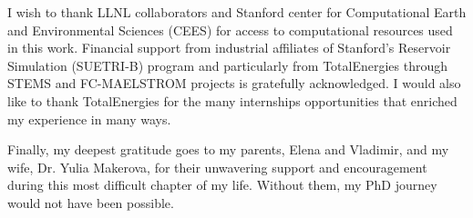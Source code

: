 I wish to thank LLNL collaborators and Stanford center for Computational Earth and Environmental Sciences (CEES) for access to computational resources used in this work.   Financial support from industrial affiliates of Stanford's Reservoir Simulation (SUETRI-B) program and particularly from TotalEnergies through STEMS and FC-MAELSTROM projects is gratefully acknowledged.   I would also like to thank TotalEnergies for the many internships opportunities that enriched my experience in many ways.

Finally, my deepest gratitude goes to my parents, Elena and Vladimir, and my wife, Dr. Yulia Makerova, for their unwavering support and encouragement during this most difficult chapter of my life.   Without them, my PhD journey would not have been possible.